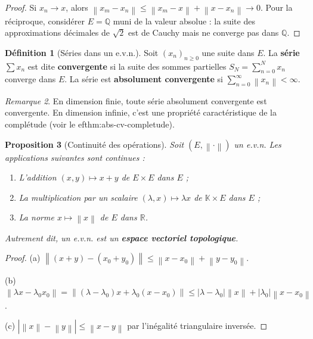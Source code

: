 \documentclass[a4paper,12pt]{book}
\newcommand{\Q}{\mathbb{Q}}
\newcommand{\R}{\mathbb{R}}
\newcommand{\K}{\mathbb{K}}
\newcommand{\norm}[1]{\left\| #1 \right\|}
\newcommand{\abs}[1]{\left| #1 \right|}
\theoremstyle{definition}
\newtheorem{definition}{Définition}[chapter]
\theoremstyle{plain}
\newtheorem{proposition}[definition]{Proposition}
\theoremstyle{remark}
\newtheorem{remarque}[definition]{Remarque}
\begin{document}
\begin{proof}
Si $x_n \to x$, alors $\norm{x_m - x_n} \leq \norm{x_m - x} + \norm{x - x_n} \to 0$. Pour la réciproque, considérer $E = \Q$ muni de la valeur absolue : la suite des approximations décimales de $\sqrt{2}$ est de Cauchy mais ne converge pas dans $\Q$.
\end{proof}

\begin{definition}[Séries dans un e.v.n.]\label{def:series-evn}
Soit $(x_n)_{n \geq 0}$ une suite dans $E$. La \textbf{série} $\sum x_n$ est dite \textbf{convergente} si la suite des sommes partielles $S_N = \sum_{n=0}^{N} x_n$ converge dans $E$. La série est \textbf{absolument convergente} si $\sum_{n=0}^{\infty} \norm{x_n} < \infty$.
\end{definition}

\begin{remarque}\label{rem:abs-cv-dim-finie}
En dimension finie, toute série absolument convergente est convergente. En dimension infinie, c'est une propriété caractéristique de la complétude (voir le 
ef{thm:abs-cv-completude}).
\end{remarque}

\begin{proposition}[Continuité des opérations]\label{prop:continuite-operations}
Soit $(E, \norm{\cdot})$ un e.v.n. Les applications suivantes sont continues :
\begin{enumerate}[label=(\alph*)]
    \item L'addition $(x, y) \mapsto x + y$ de $E \times E$ dans $E$ ;
    \item La multiplication par un scalaire $(\lambda, x) \mapsto \lambda x$ de $\K \times E$ dans $E$ ;
    \item La norme $x \mapsto \norm{x}$ de $E$ dans $\R$.
\end{enumerate}
Autrement dit, un e.v.n. est un \textbf{espace vectoriel topologique}.
\end{proposition}

\begin{proof}
(a) $\norm{(x+y) - (x_0 + y_0)} \leq \norm{x - x_0} + \norm{y - y_0}$.

(b) $\norm{\lambda x - \lambda_0 x_0} = \norm{(\lambda - \lambda_0)x + \lambda_0(x - x_0)} \leq \abs{\lambda - \lambda_0}\norm{x} + \abs{\lambda_0}\norm{x - x_0}$.

(c) $\abs{\norm{x} - \norm{y}} \leq \norm{x - y}$ par l'inégalité triangulaire inversée.
\end{proof}
\end{document}
